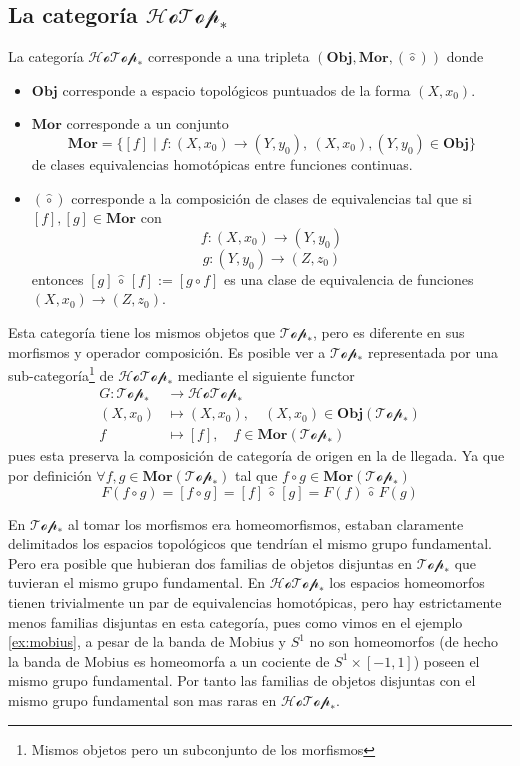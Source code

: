 \subsection{La categoría \(\mathscr{HoTop}_*\)}
\begin{definicion}
  La categoría \(\mathscr{HoTop}_*\) corresponde a una tripleta
  \((\mathbf{Obj},\mathbf {Mor}, (\hat \circ))\) donde
  \begin{itemize}
  \item \(\mathbf {Obj}\) corresponde a espacio topológicos puntuados de la
    forma \((X, x_0)\).
  \item \(\mathbf {Mor}\) corresponde a un conjunto
    \[ \mathbf{Mor} = \{ [f] \mid f : (X,x_0) \to (Y,y_0),\
      (X,x_0),(Y,y_0) \in \mathbf {Obj} \}\]
    de clases equivalencias homotópicas entre funciones continuas.
  \item \((\hat \circ)\) corresponde a la composición de clases de
    equivalencias tal que si \([f] , [g] \in \mathbf {Mor} \) con
    \[ f : (X,x_0) \to (Y, y_0)\]
    \[ g : (Y, y_0) \to (Z, z_0)\]
    entonces \([g] \, \hat \circ \, [f] := [ g \circ f ] \) es una clase
    de equivalencia de funciones \((X, x_0) \to (Z, z_0)\).
  \end{itemize}
\end{definicion}
Esta categoría tiene los mismos objetos que \(\mathscr{Top}_*\), pero es
diferente en sus morfismos y operador composición. Es posible ver a
\(\mathscr{Top}_*\) representada por una sub-categoría\footnote{Mismos
objetos pero un subconjunto de los morfismos} de \(\mathscr{HoTop}_*\)
mediante el siguiente functor
\begin{align*}
  G : \mathscr{Top}_* &\longrightarrow \mathscr{HoTop}_* \\
  \left( X , x_0 \right) &\longmapsto \left( X , x_0 \right), \quad
     \left( X, x_0 \right) \in \mathbf {Obj} \left( \mathscr{Top}_* \right) \\
  f &\longmapsto [f], \quad f \in \mathbf {Mor} \left( \mathscr{Top}_* \right)
\end{align*}
pues esta preserva la composición de categoría de origen en la de
llegada. Ya que por definición \(\forall f,g \in \mathbf {Mor}
(\mathscr{Top}_*)\) tal que \(f \circ g \in \mathbf {Mor}
(\mathscr{Top}_*)\)
\[ F(f \circ g) = [f \circ g] = [f] \, \hat \circ \, [g] = F(f) \, \hat
\circ \, F(g) \]

En \(\mathscr{Top}_*\) al tomar los morfismos era homeomorfismos,
estaban claramente delimitados los espacios topológicos que tendrían el
mismo grupo fundamental. Pero era posible que hubieran dos familias de
objetos disjuntas en \(\mathscr{Top}_*\) que tuvieran el mismo grupo
fundamental. En \(\mathscr{HoTop}_*\) los espacios homeomorfos tienen
trivialmente un par de equivalencias homotópicas, pero hay estrictamente
menos familias disjuntas en esta categoría, pues como vimos en el
ejemplo \ref{ex:mobius}, a pesar de la banda de Mobius y \(S^1\) no son
homeomorfos (de hecho la banda de Mobius es homeomorfa a un cociente de
\(S^1 \times [-1, 1]\)) poseen el mismo grupo fundamental. Por tanto las
familias de objetos disjuntas con el mismo grupo fundamental son mas
raras en \(\mathscr{HoTop}_*\).


